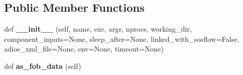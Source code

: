 \subsection*{Public Member Functions}
\begin{DoxyCompactItemize}
\item 
\mbox{\label{classcodar_1_1cheetah_1_1model_1_1_run_component_a905feca9714fa62e4cce6e740ecc411b}} 
def {\bfseries \+\_\+\+\_\+init\+\_\+\+\_\+} (self, name, exe, args, nprocs, working\+\_\+dir, component\+\_\+inputs=None, sleep\+\_\+after=None, linked\+\_\+with\+\_\+sosflow=False, adios\+\_\+xml\+\_\+file=None, env=None, timeout=None)
\item 
\mbox{\label{classcodar_1_1cheetah_1_1model_1_1_run_component_a9400f073612f8afefa3568e0205b3770}} 
def {\bfseries as\+\_\+fob\+\_\+data} (self)
\end{DoxyCompactItemize}
